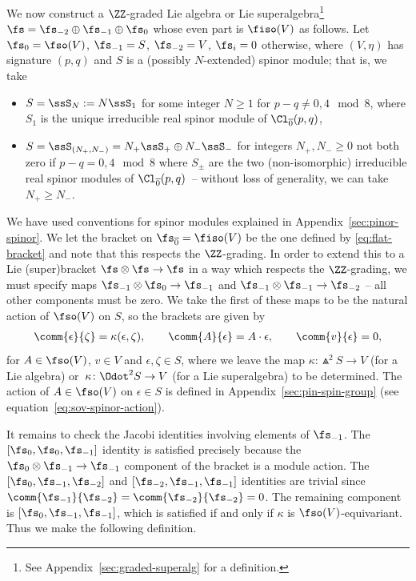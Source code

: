 We now construct a $\ZZ$-graded Lie algebra or Lie superalgebra\footnote{See Appendix~\ref{sec:graded-superalg} for a definition.} $\fs=\fs_{-2}\oplus\fs_{-1}\oplus\fs_{0}$ whose even part is $\fiso(V)$ as follows. Let
$\fs_0 = \fso(V)$, $
 \fs_{-1} = S$, $
 \fs_{-2} = V$, $
 \fs_i = 0$ otherwise,
where $(V,\eta)$ has signature $(p,q)$ and $S$ is a (possibly $N$-extended) spinor module; that is, we take
\begin{itemize}\itemsep=0pt
	\item $S = \ssS_N := N\ssS_1$ for some integer $N\geq 1$ for $p-q\neq 0,4\mod 8$, where $S_1$ is the unique irreducible real spinor module of $\Cl_{\overline 0}(p,q)$,
	\item $S = \ssS_{(N_+,N_-)} = N_+\ssS_+\oplus N_-\ssS_-$ for integers $N_+, N_-\geq 0$ not both zero if $p-q= 0,4\mod 8$ where $S_\pm$ are the two (non-isomorphic) irreducible real spinor modules of $\Cl_{\overline 0}(p,q)$~-- without loss of generality, we can take $N_+\geq N_-$.
\end{itemize}
We have used conventions for spinor modules explained in Appendix~\ref{sec:pinor-spinor}. We let the bracket on $\fs_{\overline 0}=\fiso(V)$ be the one defined by \eqref{eq:flat-bracket} and note that this respects the $\ZZ$-grading. In order to extend this to a Lie (super)bracket $\fs\otimes\fs\to\fs$ in a way which respects the $\ZZ$-grading, we must specify maps $\fs_{-1}\otimes\fs_0\to\fs_{-1}$ and $\fs_{-1}\otimes\fs_{-1}\to\fs_{-2}$ -- all other components must be zero. We take the first of these maps to be the natural action of $\fso(V)$ on $S$, so the brackets are given by
\begin{align}\label{eq:flat-spinor-bracket}
 \comm{\epsilon}{\zeta} = \kappa(\epsilon,\zeta),\qquad
 \comm{A}{\epsilon} = A\cdot\epsilon,\qquad
 \comm{v}{\epsilon} = 0,
\end{align}
for $A\in\fso(V)$, $v\in V$ and $\epsilon,\zeta\in S$, where we leave the map $\kappa\colon \Wedge^2 S\to V$ (for a Lie algebra) or~${\kappa\colon \Odot^2 S\to V}$ (for a Lie superalgebra) to be determined. The action of $A\in\fso(V)$ on $\epsilon\in S$ is defined in Appendix~\ref{sec:pin-spin-group} (see equation~\eqref{eq:sov-spinor-action}).

It remains to check the Jacobi identities involving elements of $\fs_{-1}$. The $[\fs_0,\fs_0,\fs_{-1}]$ identity is satisfied precisely because the $\fs_0\otimes\fs_{-1}\to\fs_{-1}$ component of the bracket is a module action. The $[\fs_0,\fs_{-1},\fs_{-2}]$ and $[\fs_{-2},\fs_{-1},\fs_{-1}]$ identities are trivial since $\comm{\fs_{-1}}{\fs_{-2}}=\comm{\fs_{-2}}{\fs_{-2}}=0$. The remaining component is $[\fs_0,\fs_{-1},\fs_{-1}]$, which is satisfied if and only if $\kappa$ is $\fso(V)$-equivariant. Thus we make the following definition.

